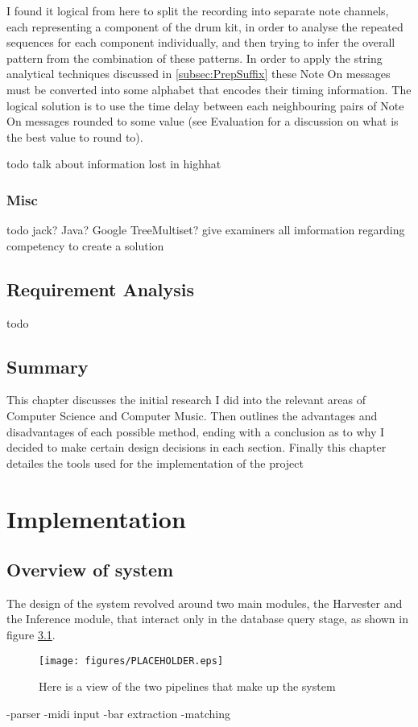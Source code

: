 \documentclass[12pt,twoside,notitlepage]{report}
\begin{document}
			I found it logical from here to split the recording into separate note channels, each representing a component of the drum kit, in order to analyse the repeated sequences for each component individually, and then trying to infer the overall pattern from the combination of these patterns. In order to apply the string analytical techniques discussed in \ref{subsec:PrepSuffix} these Note On messages must be converted into some alphabet that encodes their timing information. The logical solution is to use the time delay between each neighbouring pairs of Note On messages rounded to some value (see Evaluation for a discussion on what is the best value to round to).
			
			todo talk about information lost in highhat
			
		\subsection{Misc}
		todo jack? Java? Google TreeMultiset? give examiners all imformation regarding competency to create a solution
		
	\section{Requirement Analysis}
	todo
	\section{Summary}
	This chapter discusses the initial research I did into the relevant areas of Computer Science and Computer Music. Then outlines the advantages and disadvantages of each possible method, ending with a conclusion as to why I decided to make certain design decisions in each section. Finally this chapter detailes the tools used for the implementation of the project
\cleardoublepage
\chapter{Implementation}
	\section{Overview of system}	
	
	The design of the system revolved around two main modules, the Harvester and the Inference module, that interact only in the database query stage, as shown in figure \ref{SystemDesign}. 
	
	\begin{figure}[h]
			\centerline{\texttt{[image: figures/PLACEHOLDER.eps]}}
			\caption{\label{SystemDesign} Here is a view of the two pipelines that make up the system}
\end{figure}
	-parser
	-midi input
	-bar extraction
	-matching
\end{document}
